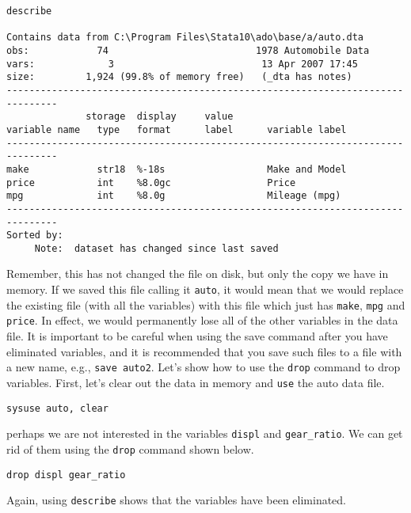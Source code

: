\begin{lstlisting}
describe

Contains data from C:\Program Files\Stata10\ado\base/a/auto.dta
obs:            74                          1978 Automobile Data
vars:             3                          13 Apr 2007 17:45
size:         1,924 (99.8% of memory free)   (_dta has notes)
-------------------------------------------------------------------------------
              storage  display     value
variable name   type   format      label      variable label
-------------------------------------------------------------------------------
make            str18  %-18s                  Make and Model
price           int    %8.0gc                 Price
mpg             int    %8.0g                  Mileage (mpg)
-------------------------------------------------------------------------------
Sorted by:
     Note:  dataset has changed since last saved
\end{lstlisting}

Remember, this has not changed the file on disk, but only the copy we have in memory. If we saved this file calling it \lstinline{auto}, it would mean that we would replace the existing file (with all the variables) with this file which just has \lstinline{make}, \lstinline{mpg} and \lstinline{price}. In effect, we would permanently lose all of the other variables in the data file. It is important to be careful when using the save command after you have eliminated variables, and it is recommended that you save such files to a file with a new name, e.g., \lstinline{save auto2}. Let's show how to use the \lstinline{drop} command to drop variables. First, let's clear out the data in memory and \lstinline{use} the auto data file.

\begin{lstlisting}
sysuse auto, clear
\end{lstlisting}

perhaps we are not interested in the variables \lstinline{displ} and \lstinline{gear_ratio}. We can get rid of them using the \lstinline{drop} command shown below.

\begin{lstlisting}
drop displ gear_ratio
\end{lstlisting}

Again, using \lstinline{describe} shows that the variables have been eliminated.

